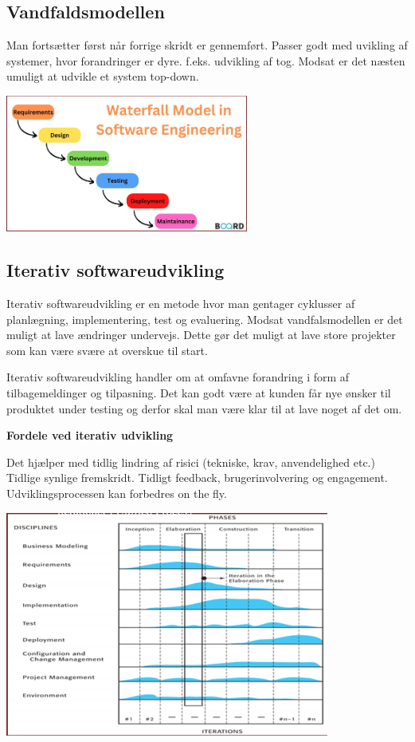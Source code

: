 \subsection{Vandfaldsmodellen}
Man fortsætter først når forrige skridt er gennemført.
Passer godt med uvikling af systemer, hvor forandringer er dyre. f.eks. udvikling af tog.
Modsat er det næsten umuligt at udvikle et system top-down.


\begin{center}
	\includegraphics[width=0.6\textwidth]{Images/vandfald.png}
\end{center}


\subsection{Iterativ softwareudvikling}

Iterativ softwareudvikling er en metode hvor man gentager cyklusser af planlægning, implementering, test og evaluering.
Modsat vandfalsmodellen er det muligt at lave ændringer undervejs. Dette gør det muligt at lave store projekter
som kan være svære at overskue til start.

Iterativ softwareudvikling handler om at omfavne forandring i form af
tilbagemeldinger og tilpasning. Det kan godt være at kunden får nye ønsker
til produktet under testing og derfor skal man være klar til at lave
noget af det om.

\textbf{Fordele ved iterativ udvikling}

Det hjælper med tidlig lindring af risici (tekniske, krav, anvendelighed etc.)
Tidlige synlige fremskridt. Tidligt feedback, brugerinvolvering og engagement.
Udviklingsprocessen kan forbedres on the fly.


\begin{center}
	\includegraphics[width=0.8\textwidth]{Images/iterativ.png}
\end{center}


